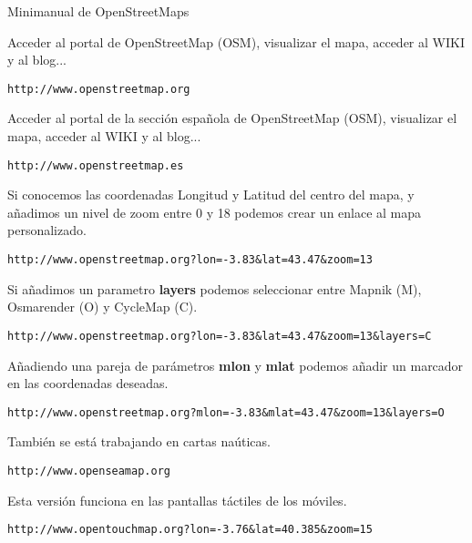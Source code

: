 \documentclass[11pt,a5]{article}
\newcommand{\web}[1]{\texttt{\color{VerdeOscuro2!50!black}\large #1}}
\newcommand{\alert}[1]{\textbf{\color{VerdeOscuro2!80!black}#1}}
\begin{document}
\newpage


\begin{center}
\color{VerdeOscuro2!50!black}\Huge Minimanual de OpenStreetMaps
\end{center}

\begin{mdframed}[style=Caja, frametitle={\Large\color{green!10!white}Portal OpenStreetMap}]
     Acceder al portal de OpenStreetMap (OSM), visualizar el mapa,
    acceder al WIKI y al blog... 

    \web{http://www.openstreetmap.org}
\end{mdframed}

\begin{mdframed}[style=Caja, frametitle={\Large\color{green!10!white}Sección española de OpenStreetMap}]
Acceder al portal de la sección española de OpenStreetMap (OSM), visualizar el
mapa, acceder al WIKI y al blog...

\web{http://www.openstreetmap.es}
\end{mdframed}

\begin{mdframed}[style=Caja, frametitle={\Large\color{green!10!white}Ver un mapa}]
 Si conocemos las coordenadas Longitud y Latitud del centro del mapa, y añadimos
un nivel de zoom entre 0 y 18 podemos crear un enlace al mapa personalizado.

\web{http://www.openstreetmap.org?lon=-3.83\&lat=43.47\&zoom=13}
\end{mdframed}

\begin{mdframed}[style=Caja, frametitle={\Large\color{green!10!white}Distintos Renders}]
 Si añadimos un parametro \alert{layers} podemos seleccionar entre Mapnik (M),
Osmarender (O) y CycleMap (C).

\web{http://www.openstreetmap.org?lon=-3.83\&lat=43.47\&zoom=13\&layers=C}
\end{mdframed}

\begin{mdframed}[style=Caja, frametitle={\Large\color{green!10!white}Marcadores}]
 Añadiendo una pareja de parámetros \alert{mlon} y \alert{mlat} podemos añadir un marcador
en las coordenadas deseadas.

\web{http://www.openstreetmap.org?mlon=-3.83\&mlat=43.47\&zoom=13\&layers=O}
\end{mdframed}

\begin{mdframed}[style=Caja, frametitle={\Large\color{green!10!white}OpenSeaMap}]
 También se está trabajando en cartas naúticas.

\web{http://www.openseamap.org}
\end{mdframed}

\begin{mdframed}[style=Caja, frametitle={\Large\color{green!10!white}OpenTouchMap}]
 Esta versión funciona en las pantallas táctiles de los móviles.

\web{http://www.opentouchmap.org?lon=-3.76\&lat=40.385\&zoom=15}
\end{mdframed}
\end{document}
